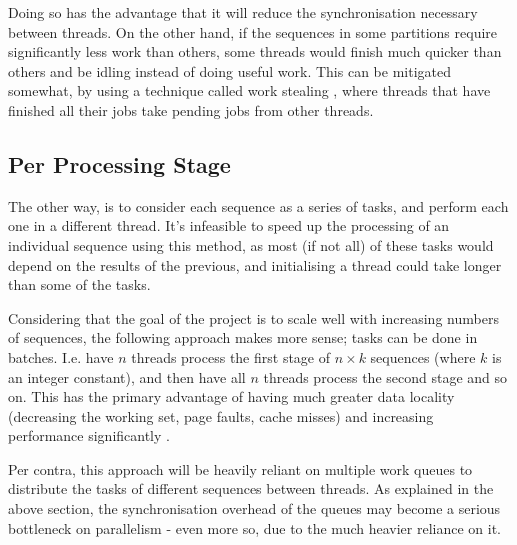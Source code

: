  Doing so has the advantage that it will reduce the synchronisation necessary between threads. On the other hand, if the sequences in some partitions require significantly less work than others, some threads would finish much quicker than others and be idling instead of doing useful work. This can be mitigated somewhat, by using a technique called work stealing \autocite{workstealing}, where threads that have finished all their jobs take pending jobs from other threads.

\subsection{Per Processing Stage}

The other way, is to consider each sequence as a series of tasks, and perform each one in a different thread. It's infeasible to speed up the processing of an individual sequence using this method, as most (if not all) of these tasks would depend on the results of the previous, and initialising a thread could take longer than some of the tasks.

Considering that the goal of the project is to scale well with increasing numbers of sequences, the following approach makes more sense; tasks can be done in batches. I.e. have $n$ threads process the first stage of $n\times k$ sequences (where $k$ is an integer constant), and then have all $n$ threads process the second stage and so on. This has the primary advantage of having much greater data locality (decreasing the working set, page faults, cache misses) and increasing performance significantly \autocite{locality}.

Per contra, this approach will be heavily reliant on multiple work queues to distribute the tasks of different sequences between threads. As explained in the above section, the synchronisation overhead of the queues may become a serious bottleneck on parallelism - even more so, due to the much heavier reliance on it.


